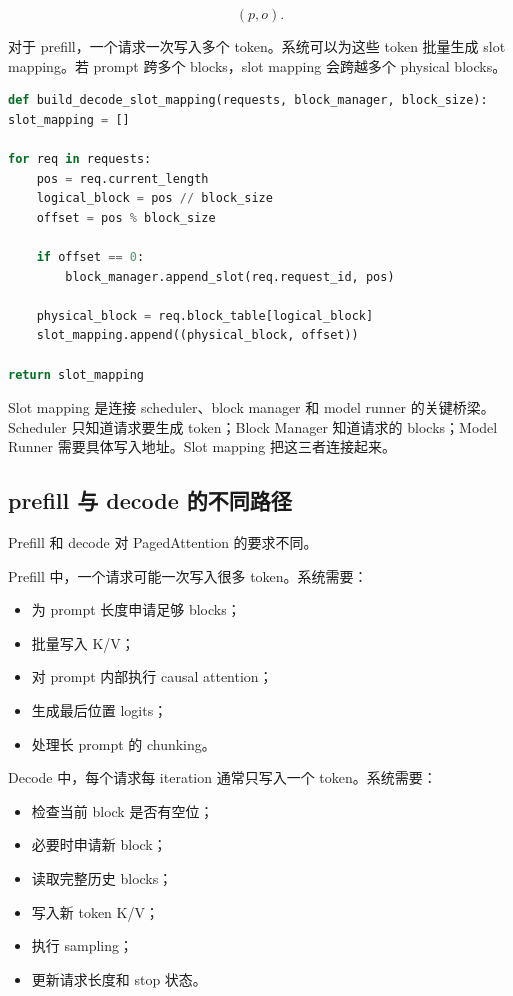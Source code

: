 \[
(p,o).
\]

对于 prefill，一个请求一次写入多个 token。系统可以为这些 token 批量生成 slot mapping。若 prompt 跨多个 blocks，slot mapping 会跨越多个 physical blocks。

\begin{lstlisting}[language=Python,caption={为 decode token 构造 slot mapping 的简化伪代码},label={lst:decode-slot-mapping-pseudocode}]
def build_decode_slot_mapping(requests, block_manager, block_size):
slot_mapping = []

for req in requests:
    pos = req.current_length
    logical_block = pos // block_size
    offset = pos % block_size

    if offset == 0:
        block_manager.append_slot(req.request_id, pos)

    physical_block = req.block_table[logical_block]
    slot_mapping.append((physical_block, offset))

return slot_mapping

\end{lstlisting}

Slot mapping 是连接 scheduler、block manager 和 model runner 的关键桥梁。Scheduler 只知道请求要生成 token；Block Manager 知道请求的 blocks；Model Runner 需要具体写入地址。Slot mapping 把这三者连接起来。

\subsection{prefill 与 decode 的不同路径}
\label{subsec:prefill-and-decode-different-paths}

Prefill 和 decode 对 PagedAttention 的要求不同。

Prefill 中，一个请求可能一次写入很多 token。系统需要：

\begin{itemize}
\item 为 prompt 长度申请足够 blocks；
\item 批量写入 K/V；
\item 对 prompt 内部执行 causal attention；
\item 生成最后位置 logits；
\item 处理长 prompt 的 chunking。
\end{itemize}

Decode 中，每个请求每 iteration 通常只写入一个 token。系统需要：

\begin{itemize}
\item 检查当前 block 是否有空位；
\item 必要时申请新 block；
\item 读取完整历史 blocks；
\item 写入新 token K/V；
\item 执行 sampling；
\item 更新请求长度和 stop 状态。
\end{itemize}

